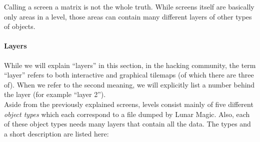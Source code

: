 Calling a screen a matrix is not the whole truth. While screens itself
are basically only areas in a level, those areas can contain many
different layers of other types of objects.

\paragraph{Layers}
\label{par:layers}

While we will explain ``layers'' in this section, in the hacking
community, the term ``layer'' refers to both interactive and graphical
tilemaps (of which there are three of). When we refer to the second
meaning, we will explicitly list a number behind the layer (for
example ``layer 2''). \\
Aside from the previously explained screens, levels consist mainly of
five different \emph{object types} which each correspond to a file
dumped by Lunar Magic. Also, each of these object types needs many
layers that contain all the data. The types and a short description
are listed here:
